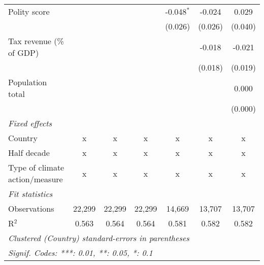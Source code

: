 \begin{tabular}{lcccccc}
   Polity score                                                 &         &                &                & -0.048$^{*}$   & -0.024         & 0.029\\   
                                                                &         &                &                & (0.026)        & (0.026)        & (0.040)\\   
   Tax revenue (\% of GDP)                                      &         &                &                &                & -0.018         & -0.021\\   
                                                                &         &                &                &                & (0.018)        & (0.019)\\   
   Population total                                             &         &                &                &                &                & 0.000\\   
                                                                &         &                &                &                &                & (0.000)\\   
   \emph{Fixed effects}\\
   Country                                                      & x       & x              & x              & x              & x              & x\\  
   Half decade                                                  & x       & x              & x              & x              & x              & x\\  
   Type of climate action/measure                               & x       & x              & x              & x              & x              & x\\  
   \midrule \emph{Fit statistics}\\
   Observations                                                 & 22,299  & 22,299         & 22,299         & 14,669         & 13,707         & 13,707\\  
   R$^2$                                                        & 0.563   & 0.564          & 0.564          & 0.581          & 0.582          & 0.582\\  
   \midrule
   \multicolumn{7}{l}{\emph{Clustered (Country) standard-errors in parentheses}}\\
   \multicolumn{7}{l}{\emph{Signif. Codes: ***: 0.01, **: 0.05, *: 0.1}}\\
\end{tabular}
\par\endgroup


